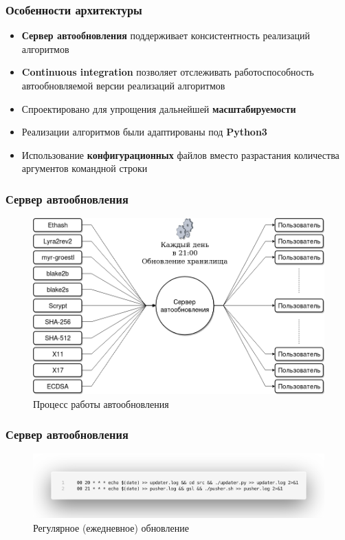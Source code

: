 \documentclass{beamer}
\begin{document}
\begin{frame}
    \frametitle{Особенности архитектуры}
    \begin{itemize}
         \item \textbf{Сервер автообновления} поддерживает консистентность
              реализаций алгоритмов
         \item \textbf{Continuous integration} позволяет отслеживать
              работоспособность автообновляемой версии реализаций алгоритмов
        \item Спроектировано для упрощения дальнейшей \textbf{масштабируемости}
        \item Реализации алгоритмов были адаптированы под
              \textbf{Python3}
        \item Использование \textbf{конфигурационных} файлов вместо разрастания
              количества аргументов командной строки
    \end{itemize}
\end{frame}

\begin{frame}
    \frametitle{Сервер автообновления}
    \begin{figure}
        \includegraphics[width=\columnwidth]{server}
        \caption{\small Процесс работы автообновления}
    \end{figure}
\end{frame}

\begin{frame}
    \frametitle{Сервер автообновления}
    \begin{figure}
        \includegraphics[width=\columnwidth]{cron}
        \caption{\small Регулярное (ежедневное) обновление}
    \end{figure}
\end{frame}
\end{document}
